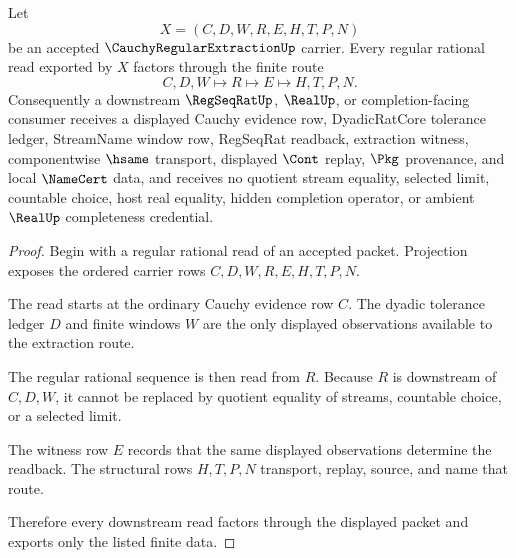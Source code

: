 \begin{theorem}
\label{thm:cauchy-regular-extraction-regseqrat-readback}
Let
$$
X=(C,D,W,R,E,H,T,P,N)
$$
be an accepted $\CauchyRegularExtractionUp$ carrier. Every regular rational read exported by $X$ factors through the finite route
$$
C,D,W \longmapsto R \longmapsto E \longmapsto H,T,P,N .
$$
Consequently a downstream $\RegSeqRatUp$, $\RealUp$, or completion-facing consumer receives a displayed Cauchy evidence row, DyadicRatCore tolerance ledger, StreamName window row, RegSeqRat readback, extraction witness, componentwise $\hsame$ transport, displayed $\Cont$ replay, $\Pkg$ provenance, and local $\NameCert$ data, and receives no quotient stream equality, selected limit, countable choice, host real equality, hidden completion operator, or ambient $\RealUp$ completeness credential.
\end{theorem}
\begin{proof}
Begin with a regular rational read of an accepted packet. Projection exposes the ordered carrier rows $C,D,W,R,E,H,T,P,N$.

The read starts at the ordinary Cauchy evidence row $C$. The dyadic tolerance ledger $D$ and finite windows $W$ are the only displayed observations available to the extraction route.

The regular rational sequence is then read from $R$. Because $R$ is downstream of $C,D,W$, it cannot be replaced by quotient equality of streams, countable choice, or a selected limit.

The witness row $E$ records that the same displayed observations determine the readback. The structural rows $H,T,P,N$ transport, replay, source, and name that route.

Therefore every downstream read factors through the displayed packet and exports only the listed finite data.
\end{proof}


